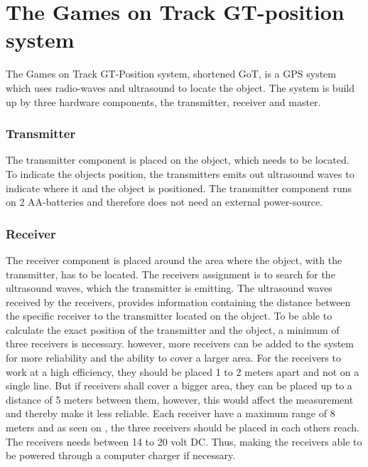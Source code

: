 \section{The Games on Track GT-position system}
\label{GoTDescription}
The Games on Track GT-Position system, shortened GoT, is a GPS system which uses radio-waves and ultrasound to locate the object. The system is build up by three hardware components, the transmitter, receiver and master. 

\subsubsection{Transmitter}
The transmitter component is placed on the object, which needs to be located. To indicate the objects position, the transmitters emits out ultrasound waves to indicate where it and the object is positioned. The transmitter component runs on 2 AA-batteries and therefore does not need an external power-source. 

\subsubsection{Receiver}
The receiver component is placed around the area where the object, with the transmitter, has to be located. The receivers assignment is to search for the ultrasound waves, which the transmitter is emitting. The ultrasound waves received by the receivers, provides information containing the distance between the specific receiver to the transmitter located on the object. To be able to calculate the exact position of the transmitter and the object, a minimum of three receivers is necessary. however, more receivers can be added to the system for more reliability and the ability to cover a larger area. For the receivers to work at a high efficiency, they should be placed 1 to 2 meters apart and not on a single line. But if receivers shall cover a bigger area, they can be placed up to a distance of 5 meters between them, however, this would affect the measurement and thereby make it less reliable. Each receiver have a maximum range of 8 meters and as seen on , the three receivers should be placed in each others reach. The receivers needs between 14 to 20 volt DC. Thus, making the receivers able to be powered through a computer charger if necessary.

